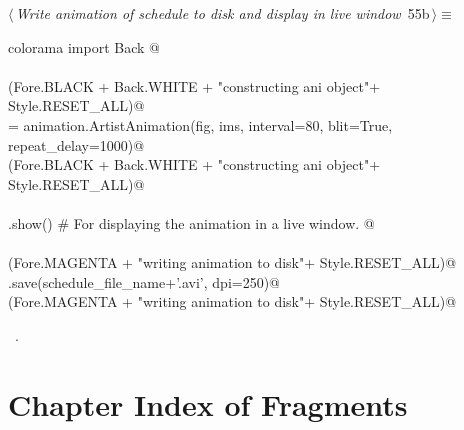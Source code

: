 \documentclass[11.5pt]{report}
\begin{document}
\vspace{-0.8cm} \newchunk


\begin{flushleft} \small\label{scrap88}\raggedright\small
{} $\langle\,${\itshape Write animation of schedule to disk and display in live window}\nobreak\ {\footnotesize {55b}}$\,\rangle\equiv$
\vspace{-1ex}
\begin{list}{}{} \item
\mbox{}\verb@from colorama import Back @\\
\mbox{}\verb@@\\
\mbox{}\verb@debug(Fore.BLACK + Back.WHITE + "\nStarted constructing ani object"+ Style.RESET_ALL)@\\
\mbox{}\verb@ani = animation.ArtistAnimation(fig, ims, interval=80, blit=True, repeat_delay=1000)@\\
\mbox{}\verb@debug(Fore.BLACK + Back.WHITE + "\nFinished constructing ani object"+ Style.RESET_ALL)@\\
\mbox{}\verb@@\\
\mbox{}\verb@plt.show() # For displaying the animation in a live window. @\\
\mbox{}\verb@@\\
\mbox{}\verb@debug(Fore.MAGENTA + "\nStarted writing animation to disk"+ Style.RESET_ALL)@\\
\mbox{}\verb@ani.save(schedule_file_name+'.avi', dpi=250)@\\
\mbox{}\verb@debug(Fore.MAGENTA + "\nFinished writing animation to disk"+ Style.RESET_ALL)@\\
\mbox{}\verb@@{\NWsep}
\end{list}
\vspace{-1.5ex}
\footnotesize
\begin{list}{}{\setlength{\itemsep}{-\parsep}\setlength{\itemindent}{-\leftmargin}}
\item \NWtxtMacroRefIn\ .

\item{}
\end{list}
\vspace{4ex}
\end{flushleft}

\section{Chapter Index of Fragments}
\end{document}
